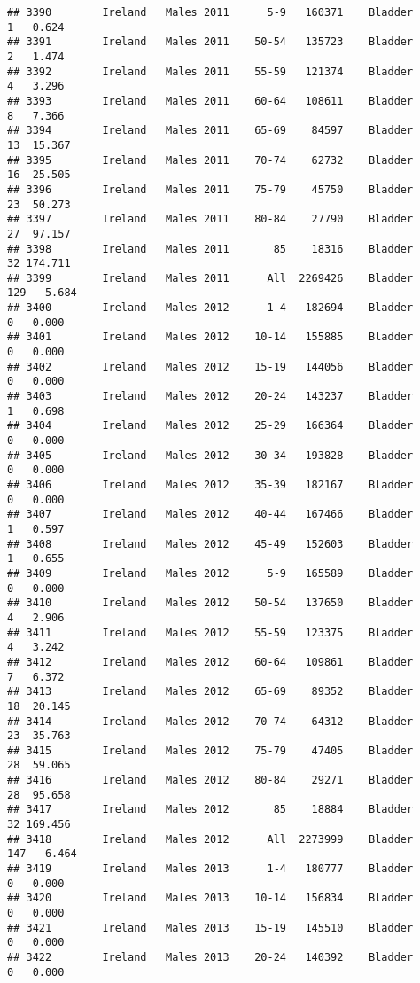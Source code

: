 \documentclass[
]{article}
\begin{document}
\begin{verbatim}
## 3390        Ireland   Males 2011      5-9   160371    Bladder      1   0.624
## 3391        Ireland   Males 2011    50-54   135723    Bladder      2   1.474
## 3392        Ireland   Males 2011    55-59   121374    Bladder      4   3.296
## 3393        Ireland   Males 2011    60-64   108611    Bladder      8   7.366
## 3394        Ireland   Males 2011    65-69    84597    Bladder     13  15.367
## 3395        Ireland   Males 2011    70-74    62732    Bladder     16  25.505
## 3396        Ireland   Males 2011    75-79    45750    Bladder     23  50.273
## 3397        Ireland   Males 2011    80-84    27790    Bladder     27  97.157
## 3398        Ireland   Males 2011       85    18316    Bladder     32 174.711
## 3399        Ireland   Males 2011      All  2269426    Bladder    129   5.684
## 3400        Ireland   Males 2012      1-4   182694    Bladder      0   0.000
## 3401        Ireland   Males 2012    10-14   155885    Bladder      0   0.000
## 3402        Ireland   Males 2012    15-19   144056    Bladder      0   0.000
## 3403        Ireland   Males 2012    20-24   143237    Bladder      1   0.698
## 3404        Ireland   Males 2012    25-29   166364    Bladder      0   0.000
## 3405        Ireland   Males 2012    30-34   193828    Bladder      0   0.000
## 3406        Ireland   Males 2012    35-39   182167    Bladder      0   0.000
## 3407        Ireland   Males 2012    40-44   167466    Bladder      1   0.597
## 3408        Ireland   Males 2012    45-49   152603    Bladder      1   0.655
## 3409        Ireland   Males 2012      5-9   165589    Bladder      0   0.000
## 3410        Ireland   Males 2012    50-54   137650    Bladder      4   2.906
## 3411        Ireland   Males 2012    55-59   123375    Bladder      4   3.242
## 3412        Ireland   Males 2012    60-64   109861    Bladder      7   6.372
## 3413        Ireland   Males 2012    65-69    89352    Bladder     18  20.145
## 3414        Ireland   Males 2012    70-74    64312    Bladder     23  35.763
## 3415        Ireland   Males 2012    75-79    47405    Bladder     28  59.065
## 3416        Ireland   Males 2012    80-84    29271    Bladder     28  95.658
## 3417        Ireland   Males 2012       85    18884    Bladder     32 169.456
## 3418        Ireland   Males 2012      All  2273999    Bladder    147   6.464
## 3419        Ireland   Males 2013      1-4   180777    Bladder      0   0.000
## 3420        Ireland   Males 2013    10-14   156834    Bladder      0   0.000
## 3421        Ireland   Males 2013    15-19   145510    Bladder      0   0.000
## 3422        Ireland   Males 2013    20-24   140392    Bladder      0   0.000

\end{verbatim}
\end{document}
